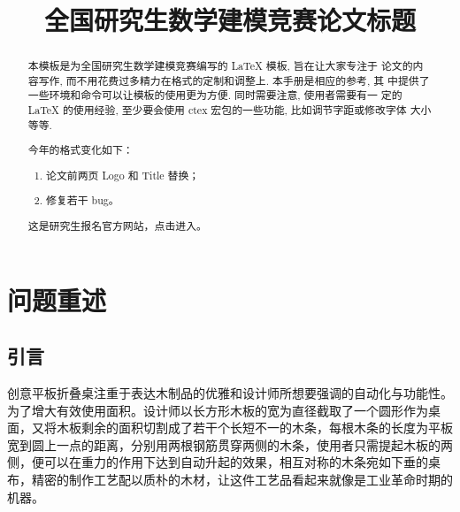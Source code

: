 \documentclass[bwprint,fontset=windows]{gmcmthesis}
\title{全国研究生数学建模竞赛论文标题}
\begin{document}
 \maketitle

\begin{abstract}
本模板是为全国研究生数学建模竞赛编写的 \LaTeX{} 模板, 旨在让大家专注于
论文的内容写作, 而不用花费过多精力在格式的定制和调整上. 本手册是相应的参考, 其
中提供了一些环境和命令可以让模板的使用更为方便. 同时需要注意, 使用者需要有一
定的 \LaTeX{} 的使用经验, 至少要会使用 ctex 宏包的一些功能, 比如调节字距或修改字体
大小等等.

\begin{mdframed}[%
roundcorner=5pt,linecolor=gray!50,outerlinewidth=0.5pt,
middlelinewidth=0.3pt,backgroundcolor=gray!2,
innertopmargin=\topskip, frametitle={2026年格式变化说明},
frametitlefont= \bfseries,frametitlerule=true,frametitlealignment =\raggedright\noindent,
frametitlerulewidth=.5pt, frametitlebackgroundcolor=gray!2,]
今年的格式变化如下：
\begin{enumerate}
\item 论文前两页 Logo 和 Title 替换；
\item 修复若干 bug。
\end{enumerate}
\end{mdframed}

这是研究生报名官方网站，点击\href{https://cpipc.chinadegrees.cn}{}进入。



\end{abstract}

\pagestyle{plain}

\maketoc

\clearpage

\section{问题重述}

\subsection{引言}   %

创意平板折叠桌注重于表达木制品的优雅和设计师所想要强调的自动化与功能性。为了增大有效使用面积。设计师以长方形木板的宽为直径截取了一个圆形作为桌面，又将木板剩余的面积切割成了若干个长短不一的木条，每根木条的长度为平板宽到圆上一点的距离，分别用两根钢筋贯穿两侧的木条，使用者只需提起木板的两侧，便可以在重力的作用下达到自动升起的效果，相互对称的木条宛如下垂的桌布，精密的制作工艺配以质朴的木材，让这件工艺品看起来就像是工业革命时期的机器。
\end{document}
